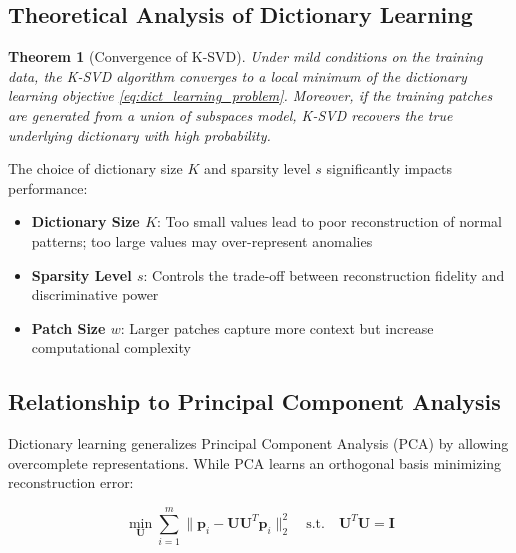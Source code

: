 \documentclass[12pt]{article}
\newcommand{\patch}{\mathbf{p}}
\newtheorem{theorem}{Theorem}[section]
\begin{document}
\subsection{Theoretical Analysis of Dictionary Learning}
\label{subsec:dict_theory}

\begin{theorem}[Convergence of K-SVD]
    \label{thm:ksvd_convergence}
    Under mild conditions on the training data, the K-SVD algorithm converges to a local minimum of the dictionary learning objective \eqref{eq:dict_learning_problem}. Moreover, if the training patches are generated from a union of subspaces model, K-SVD recovers the true underlying dictionary with high probability.
\end{theorem}

The choice of dictionary size $K$ and sparsity level $s$ significantly impacts performance:

\begin{itemize}[leftmargin=*]
    \item \textbf{Dictionary Size $K$}: Too small values lead to poor reconstruction of normal patterns; too large values may over-represent anomalies
    \item \textbf{Sparsity Level $s$}: Controls the trade-off between reconstruction fidelity and discriminative power
    \item \textbf{Patch Size $w$}: Larger patches capture more context but increase computational complexity
\end{itemize}

\subsection{Relationship to Principal Component Analysis}
\label{subsec:pca_connection}

Dictionary learning generalizes Principal Component Analysis (PCA) by allowing overcomplete representations. While PCA learns an orthogonal basis minimizing reconstruction error:

\begin{equation}
    \label{eq:pca_objective}
    \min_{\mathbf{U}} \sum_{i=1}^m \|\patch_i - \mathbf{U}\mathbf{U}^T\patch_i\|_2^2 \quad \text{s.t.} \quad \mathbf{U}^T\mathbf{U} = \mathbf{I}
\end{equation}
\end{document}
